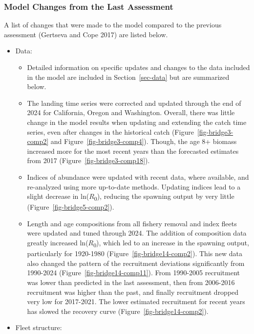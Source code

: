 \documentclass[
]{scrartcl}
\providecommand{\tightlist}{%
  \setlength{\itemsep}{0pt}\setlength{\parskip}{0pt}}\usepackage{longtable,booktabs,array}
\begin{document}
\subsubsection{Model Changes from the Last
Assessment}\label{sec-changes}

A list of changes that were made to the model compared to the previous
assessment (Gertseva and Cope 2017) are listed below.

\begin{itemize}
\tightlist
\item
  Data:

  \begin{itemize}
  \tightlist
  \item
    Detailed information on specific updates and changes to the data
    included in the model are included in Section~\ref{sec-data} but are
    summarized below.
  \item
    The landing time series were corrected and updated through the end
    of 2024 for California, Oregon and Washington. Overall, there was
    little change in the model results when updating and extending the
    catch time series, even after changes in the historical catch
    (Figure~\ref{fig-bridge3-comp2} and Figure~\ref{fig-bridge3-comp4}).
    Though, the age 8+ biomass increased more for the most recent years
    than the forecasted estimates from 2017
    (Figure~\ref{fig-bridge3-comp18}).\\
  \item
    Indices of abundance were updated with recent data, where available,
    and re-analyzed using more up-to-date methods. Updating indices lead
    to a slight decrease in ln(\(R\)\textsubscript{0}), reducing the
    spawning output by very little (Figure~\ref{fig-bridge5-comp2}).
  \item
    Length and age compositions from all fishery removal and index
    fleets were updated and tuned through 2024. The addition of
    composition data greatly increased ln(\(R\)\textsubscript{0}), which
    led to an increase in the spawning output, particularly for
    1920-1980 (Figure~\ref{fig-bridge14-comp2}). This new data also
    changed the pattern of the recruitment deviations significantly from
    1990-2024 (Figure~\ref{fig-bridge14-comp11}). From 1990-2005
    recruitment was lower than predicted in the last assessment, then
    from 2006-2016 recruitment was higher than the past, and finally
    recruitment dropped very low for 2017-2021. The lower estimated
    recruitment for recent years has slowed the recovery curve
    (Figure~\ref{fig-bridge14-comp2}).
  \end{itemize}
\item
  Fleet structure:


\end{itemize}
\end{document}
